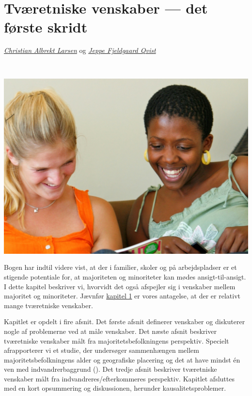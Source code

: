 \documentclass[
]{book}
\begin{document}
\chapter{Tværetniske venskaber --- det første skridt}\label{kap6}

\thispagestyle{empty}

\emph{\href{https://vbn.aau.dk/en/persons/albrekt}{Christian Albrekt Larsen}} og \emph{\href{https://vbn.aau.dk/da/persons/jeppefl}{Jeppe Fjeldgaard Qvist}}

~~~~

\includegraphics[width=1\linewidth]{images/kap71}

\newpage

Bogen har indtil videre vist, at der i familier, skoler og på arbejdspladser er et stigende potentiale for, at majoriteten og minoriteter kan mødes ansigt-til-ansigt. I dette kapitel beskriver vi, hvorvidt det også afspejler sig i venskaber mellem majoritet og minoriteter. Jævnfør \hyperref[kap1]{kapitel 1} er vores antagelse, at der er relativt mange tværetniske venskaber.

Kapitlet er opdelt i fire afsnit. Det første afsnit definerer venskaber og diskuterer nogle af problemerne ved at måle venskaber. Det næste afsnit beskriver tværetniske venskaber målt fra majoritetsbefolkningens perspektiv. Specielt afrapporterer vi et studie, der undersøger sammenhængen mellem majoritetsbefolkningens alder og geografiske placering og det at have mindst én ven med indvandrerbaggrund (). Det tredje afsnit beskriver tværetniske venskaber målt fra indvandreres/efterkommeres perspektiv. Kapitlet afsluttes med en kort opsummering og diskussionen, herunder kausalitetsproblemer.
\end{document}

